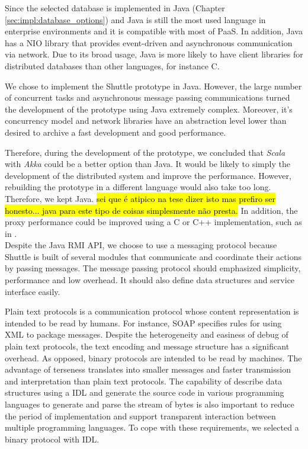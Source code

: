 Since the selected database is implemented in Java (Chapter \ref{sec:impl:database_options}) and Java is still the most used language in enterprise environments and it is compatible with most of \ac{PaaS}. In addition, Java has a \acf{NIO} library that provides event-driven and asynchronous communication via network. Due to its broad usage, Java is more likely to have client libraries for distributed databases than other languages, for instance C.

We chose to implement the Shuttle prototype in Java. However, the large number of concurrent tasks and asynchronous message passing communications turned the development of the prototype using Java extremely complex. Moreover, it's concurrency model and network libraries have an abstraction level lower than desired to archive a fast development and good performance.

Therefore, during the development of the prototype, we concluded that \emph{Scala} with \emph{Akka} could be a better option than Java. It would be likely to simply the development of the distributed system and improve the performance. However, rebuilding the prototype in a different language would also take too long. Therefore, we kept Java. \hl{sei que é atipico na tese dizer isto mas prefiro ser honesto... java para este tipo de coisas simplesmente não presta.}
In addition, the proxy performance could be improved using a C or C++ implementation, such as in \cite{haproxy}. \\

Despite the Java \acf{RMI} \ac{API}, we choose to use a messaging protocol because Shuttle is built of several modules that communicate and coordinate their actions by passing messages. The message passing protocol should emphasized simplicity, performance and low overhead. It should also define data structures and service interface easily. 

Plain text protocols is a communication protocol whose content representation is intended to be read by humans. For instance, \acf{SOAP} \cite{soap} specifies rules for using XML to package messages. Despite the heterogeneity and easiness of debug of plain text protocols, the text encoding and message structure has a significant overhead. As opposed, binary protocols are intended to be read by machines. The advantage of terseness translates into smaller messages and faster transmission and interpretation than plain text protocols. The capability of describe data structures using a \acf{IDL} and generate the source code in various programming languages to generate and parse the stream of bytes is also important to reduce the period of implementation and support transparent interaction between multiple programming languages. To cope with these requirements, we selected a binary protocol with \ac{IDL}. 

